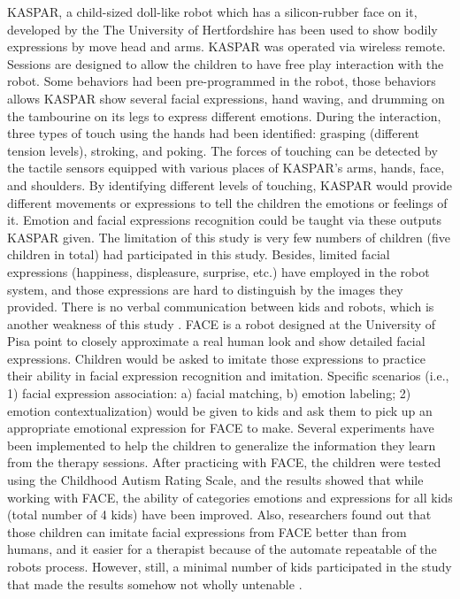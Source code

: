 KASPAR, a child-sized doll-like robot which has a silicon-rubber face on it, developed by the 
The University of Hertfordshire has been used to show bodily expressions by move head and arms. KASPAR 
was operated via wireless remote. Sessions are designed to allow the children to have free play 
interaction with the robot. Some behaviors had been pre-programmed in the robot, those behaviors allows 
KASPAR show several facial expressions, hand waving, and drumming on the tambourine on its legs 
to express different emotions. During the interaction, three types of touch using the hands had been 
identified: grasping (different tension levels), stroking, and poking. The forces of touching can be 
detected by the tactile sensors equipped with various places of KASPAR’s arms, hands, face, and shoulders. 
By identifying different levels of touching, KASPAR would provide different movements or expressions 
to tell the children the emotions or feelings of it. Emotion and facial expressions recognition could 
be taught via these outputs KASPAR given. The limitation of this study is very few numbers of children 
(five children in total) had participated in this study. Besides, limited facial expressions (happiness, 
displeasure, surprise, etc.) have employed in the robot system, and those expressions are hard to 
distinguish by the images they provided. There is no verbal communication between kids and robots, 
which is another weakness of this study \cite{robins2006does}. FACE is a robot designed at the University of Pisa 
point to closely approximate a real human look and show detailed facial expressions. Children would 
be asked to imitate those expressions to practice their ability in facial expression recognition and 
imitation. Specific scenarios (i.e., 1) facial expression association: a) facial matching, b) emotion 
labeling; 2) emotion contextualization) would be given to kids and ask them to pick up an appropriate 
emotional expression for FACE to make. Several experiments have been implemented to help the children 
to generalize the information they learn from the therapy sessions. After practicing with FACE, the 
children were tested using the Childhood Autism Rating Scale, and the results showed that while working 
with FACE, the ability of categories emotions and expressions for all kids (total number of 4 kids) have 
been improved. Also, researchers found out that those children can imitate facial expressions from FACE 
better than from humans, and it easier for a therapist because of the automate repeatable of 
the robots process. However, still, a minimal number of kids participated in the study that made the 
results somehow not wholly untenable \cite{pioggia2005android}.\\


